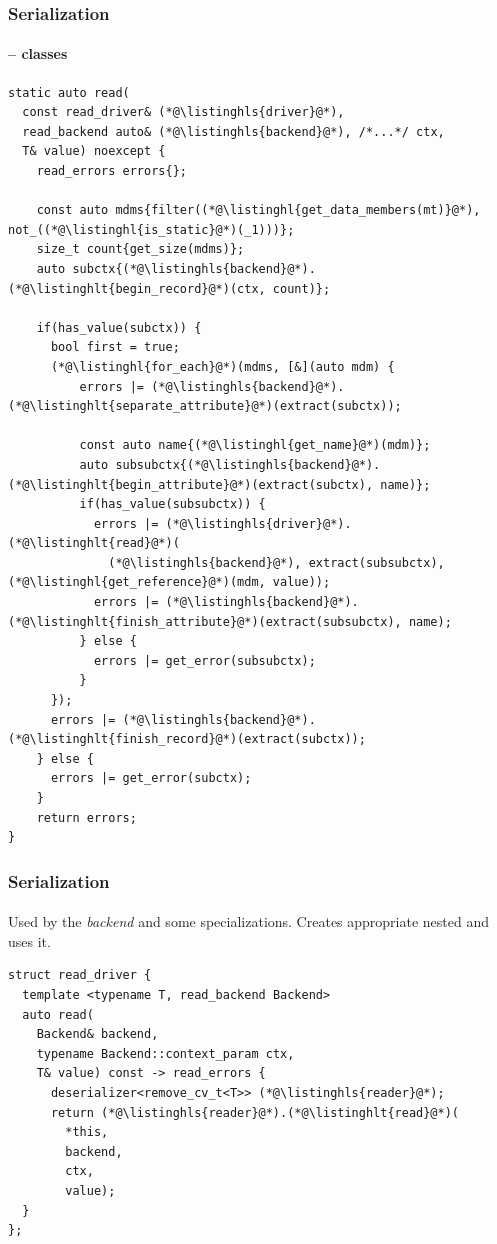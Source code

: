 \documentclass[compress,table,xcolor=table]{beamer}
\begin{document}
\begin{frame}[fragile]
  \frametitle{Serialization}
  \framesubtitle{ -- classes}
  \begin{lstlisting}[language=c++2x,basicstyle=\tiny\ttfamily]
static auto read(
  const read_driver& (*@\listinghls{driver}@*),
  read_backend auto& (*@\listinghls{backend}@*), /*...*/ ctx,
  T& value) noexcept {
    read_errors errors{};

    const auto mdms{filter((*@\listinghl{get_data_members(mt)}@*), not_((*@\listinghl{is_static}@*)(_1)))};
    size_t count{get_size(mdms)};
    auto subctx{(*@\listinghls{backend}@*).(*@\listinghlt{begin_record}@*)(ctx, count)};

    if(has_value(subctx)) {
      bool first = true;
      (*@\listinghl{for_each}@*)(mdms, [&](auto mdm) {
          errors |= (*@\listinghls{backend}@*).(*@\listinghlt{separate_attribute}@*)(extract(subctx));

          const auto name{(*@\listinghl{get_name}@*)(mdm)};
          auto subsubctx{(*@\listinghls{backend}@*).(*@\listinghlt{begin_attribute}@*)(extract(subctx), name)};
          if(has_value(subsubctx)) {
            errors |= (*@\listinghls{driver}@*).(*@\listinghlt{read}@*)(
              (*@\listinghls{backend}@*), extract(subsubctx), (*@\listinghl{get_reference}@*)(mdm, value));
            errors |= (*@\listinghls{backend}@*).(*@\listinghlt{finish_attribute}@*)(extract(subsubctx), name);
          } else {
            errors |= get_error(subsubctx);
          }
      });
      errors |= (*@\listinghls{backend}@*).(*@\listinghlt{finish_record}@*)(extract(subctx));
    } else {
      errors |= get_error(subctx);
    }
    return errors;
}
  \end{lstlisting}
\end{frame}
\begin{frame}[fragile]
  \frametitle{Serialization}
  \framesubtitle{}
  Used by the {\em backend} and some  specializations.
  Creates appropriate nested  and uses it.
  \begin{lstlisting}[language=c++2x,basicstyle=\small\ttfamily]
struct read_driver {
  template <typename T, read_backend Backend>
  auto read(
    Backend& backend,
    typename Backend::context_param ctx,
    T& value) const -> read_errors {
      deserializer<remove_cv_t<T>> (*@\listinghls{reader}@*);
      return (*@\listinghls{reader}@*).(*@\listinghlt{read}@*)(
        *this,
        backend,
        ctx,
        value);
  }
};
  \end{lstlisting}
\end{frame}
\end{document}
